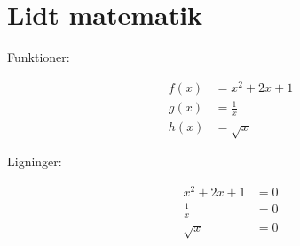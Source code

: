 \section{Lidt matematik}

Funktioner:

\begin{align}
  f(x) &= x^2 + 2x + 1 \\
  g(x) &= \frac{1}{x} \\
  h(x) &= \sqrt{x}
\end{align}


Ligninger:

\begin{align}
  x^2 + 2x + 1 &= 0 \\
  \frac{1}{x} &= 0 \\
  \sqrt{x} &= 0
\end{align}

